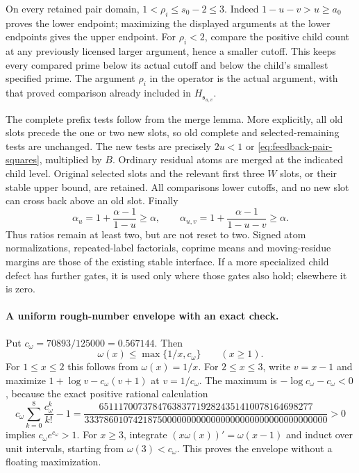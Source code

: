 \documentclass[11pt]{article}
\begin{document}
On every retained pair domain, $1<\rho_i\le s_0-2\le3$.
Indeed $1-u-v>u\ge a_0$ proves the lower endpoint; maximizing
the displayed arguments at the lower endpoints gives the upper
endpoint.  For $\rho_i<2$, compare the positive child count at
any previously licensed larger argument, hence a smaller cutoff.
This keeps every compared prime below its actual cutoff and below
the child's smallest specified prime.  The argument $\rho_i$ in
the operator is the actual argument, with that proved comparison
already included in $H_{\mathfrak s_{u,v}}$.

The complete prefix tests follow from the merge lemma.  More
explicitly, all old slots precede the one or two new slots, so
old complete and selected-remaining tests are unchanged.  The
new tests are precisely $2u<1$ or
\eqref{eq:feedback-pair-squares}, multiplied by $B$.
Ordinary residual atoms are merged at the indicated child level.
Original selected slots and the relevant first three $W$ slots,
or their stable upper bound, are retained.  All comparisons lower
cutoffs, and no new slot can cross back above an old slot.
Finally
\[
 \alpha_u=1+\frac{\alpha-1}{1-u}\ge\alpha,\qquad
 \alpha_{u,v}=1+\frac{\alpha-1}{1-u-v}\ge\alpha.
\]
Thus ratios remain at least two, but are not reset to two.
Signed atom normalizations, repeated-label factorials, coprime
means and moving-residue margins are those of the existing stable
interface.  If a more specialized child defect has further gates,
it is used only where those gates also hold; elsewhere it is zero.

\paragraph{A uniform rough-number envelope with an exact check.}
Put $c_\omega=70893/125000=0.567144$.  Then
\begin{equation}\label{eq:feedback-omega-envelope}
 \omega(x)\le\max\{1/x,c_\omega\}\qquad(x\ge1).
\end{equation}
For $1\le x\le2$ this follows from $\omega(x)=1/x$.
For $2\le x\le3$, write $v=x-1$ and maximize
$1+\log v-c_\omega(v+1)$ at $v=1/c_\omega$.
The maximum is $-\log c_\omega-c_\omega<0$, because the exact
positive rational calculation
\[
 c_\omega\sum_{k=0}^{8}\frac{c_\omega^k}{k!}-1
 =\frac{65111700737847638377192824351410078164698277}
 {33378601074218750000000000000000000000000000000000}>0
\]
implies $c_\omega e^{c_\omega}>1$.
For $x\ge3$, integrate $(x\omega(x))'=\omega(x-1)$ and induct
over unit intervals, starting from $\omega(3)<c_\omega$.
This proves the envelope without a floating maximization.
\end{document}
